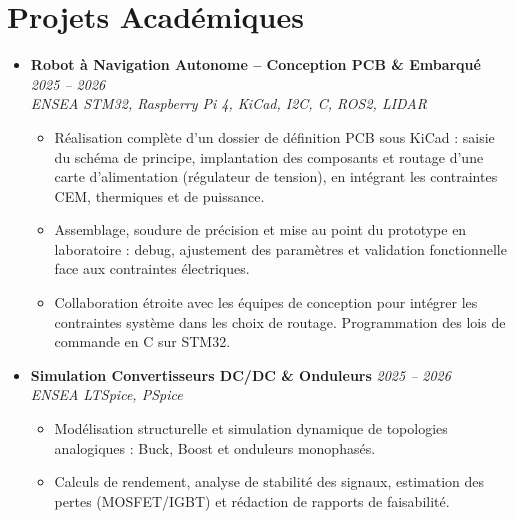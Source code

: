 \documentclass[a4paper,11pt]{article}
\begin{document}
\section{Projets Académiques}
\begin{itemize}[leftmargin=*, label={-}, itemsep=1pt]

\item \textbf{Robot à Navigation Autonome -- Conception PCB \& Embarqué} \hfill \textit{2025 -- 2026} \\
\textit{ENSEA} \hfill \textit{STM32, Raspberry Pi 4, KiCad, I2C, C, ROS2, LIDAR}
\vspace{-2pt}
    \begin{itemize}[leftmargin=0.4cm, nosep, label=\tiny$\bullet$]
        \item \small{Réalisation complète d'un dossier de définition PCB sous KiCad : saisie du schéma de principe, implantation des composants et routage d'une carte d'alimentation (régulateur de tension), en intégrant les contraintes CEM, thermiques et de puissance.}
        \item \small{Assemblage, soudure de précision et mise au point du prototype en laboratoire : debug, ajustement des paramètres et validation fonctionnelle face aux contraintes électriques.}
        \item \small{Collaboration étroite avec les équipes de conception pour intégrer les contraintes système dans les choix de routage. Programmation des lois de commande en C sur STM32.}
    \end{itemize}

\item \textbf{Simulation Convertisseurs DC/DC \& Onduleurs} \hfill \textit{2025 -- 2026} \\
\textit{ENSEA} \hfill \textit{LTSpice, PSpice}
\vspace{-2pt}
    \begin{itemize}[leftmargin=0.4cm, nosep, label=\tiny$\bullet$]
        \item \small{Modélisation structurelle et simulation dynamique de topologies analogiques : Buck, Boost et onduleurs monophasés.}
        \item \small{Calculs de rendement, analyse de stabilité des signaux, estimation des pertes (MOSFET/IGBT) et rédaction de rapports de faisabilité.}
    \end{itemize}


\end{itemize}
\end{document}
